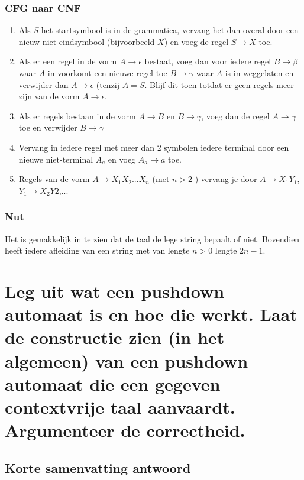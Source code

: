 \documentclass{article}
\begin{document}
        \subsubsection{CFG naar CNF}
            \begin{enumerate}
                \item Als $S$ het startsymbool is in de grammatica, vervang het dan overal door een nieuw niet-eindsymbool (bijvoorbeeld $X$) en voeg de regel $S \rightarrow X$ toe.
                \item Als er een regel in de vorm $A \rightarrow \epsilon$ bestaat, voeg dan voor iedere regel $B \rightarrow \beta$ waar $A$ in voorkomt een nieuwe regel toe $B \rightarrow \gamma$ waar $A$ is in weggelaten en verwijder dan $A \rightarrow \epsilon$ (tenzij $A=S$. Blijf dit toen totdat er geen regels meer zijn van de vorm $A \rightarrow \epsilon$.
                \item Als er regels bestaan in de vorm $A \rightarrow B$ en $B \rightarrow \gamma$, voeg dan de regel $A \rightarrow \gamma$ toe en verwijder $B \rightarrow \gamma$
                \item Vervang in iedere regel met meer dan 2 symbolen iedere terminal door een nieuwe niet-terminal $A_a$ en voeg $A_a \rightarrow a$ toe.
                \item Regels van de vorm $A \rightarrow X_1X_2...X_n$ (met $ n > 2$ ) vervang je door $A \rightarrow X_1Y_1$,$Y_1 \rightarrow X_2Y2$,...
            \end{enumerate}
        \subsubsection{Nut}
            Het is gemakkelijk in te zien dat de taal de lege string bepaalt of niet. Bovendien heeft iedere afleiding van een string met van lengte $n > 0$ lengte $2n -1$.


\newpage
\section{Leg uit wat een pushdown automaat is en hoe die werkt. Laat de constructie zien (in het algemeen) van een pushdown automaat die een gegeven contextvrije taal aanvaardt. Argumenteer de correctheid.}
    \subsection{Korte samenvatting antwoord}
\end{document}
